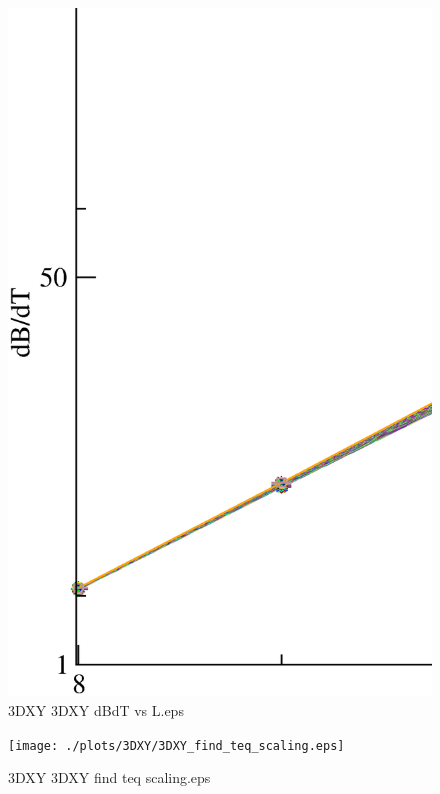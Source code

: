 \begin{figure}[!htpb]
  \centering
  \includegraphics[width=\textwidth]{./plots/3DXY/3DXY_dBdT_vs_L.eps}
  \caption{3DXY 3DXY dBdT vs L.eps}
\end{figure}

\begin{figure}[!htpb]
  \centering
  \texttt{[image: ./plots/3DXY/3DXY\_find\_teq\_scaling.eps]}
  \caption{3DXY 3DXY find teq scaling.eps}
\end{figure}


